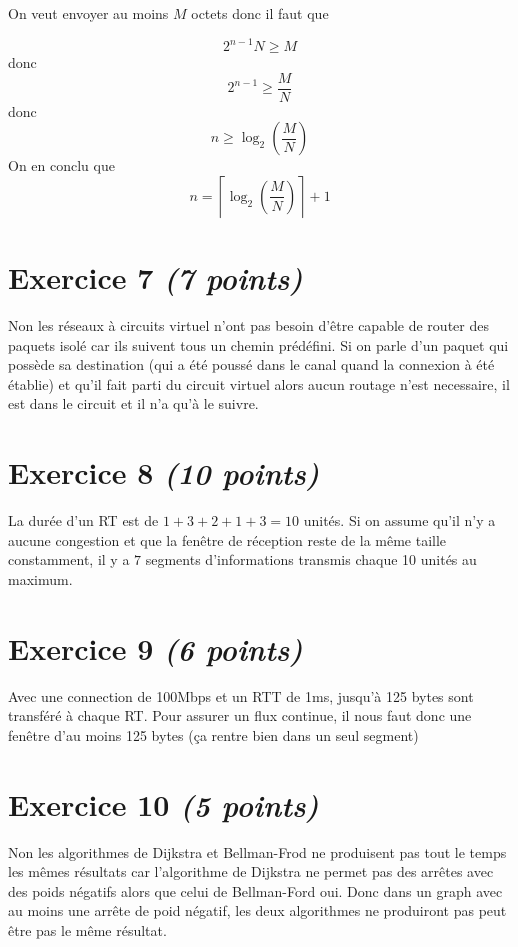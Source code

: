 \documentclass{article}
\begin{document}
\hfill

On veut envoyer au moins $M$ octets donc il faut que 

$$ 2^{n-1} N \geqslant M  $$ donc $$ 2^{n-1} \geqslant \frac{M}{N} $$ donc $$ n \geqslant \log_2\left(\frac{M}{N}\right)$$
On en conclu que $$ n = \left\lceil \log_2\left(\frac{M}{N}\right)\right\rceil +1$$

\clearpage

\section{Exercice 7 \emph{(7 points)}}

Non les réseaux à circuits virtuel n'ont pas besoin d'être capable de router des paquets isolé car ils suivent tous un chemin prédéfini. Si on parle d'un paquet qui possède sa destination (qui a été poussé dans le canal quand la connexion à été établie) et qu'il fait parti du circuit virtuel alors aucun routage n'est necessaire, il est dans le circuit et il n'a qu'à le suivre.


\section{Exercice 8 \emph{(10 points)}}
La durée d'un RT est de $1 + 3 + 2 + 1 + 3 = 10$ unités. Si on assume qu'il n'y a aucune congestion et que la fenêtre de réception reste de la même taille constamment, il y a $7$ segments d'informations transmis chaque 10 unités au maximum.


\section{Exercice 9 \emph{(6 points)}}
Avec  une connection de 100Mbps et un RTT de 1ms, jusqu'à 125 bytes sont transféré à chaque RT.
Pour assurer un flux continue, il nous faut donc une fenêtre d'au moins 125 bytes (ça rentre bien dans un seul segment)


\section{Exercice 10 \emph{(5 points)}}

Non les algorithmes de Dijkstra et Bellman-Frod ne produisent pas tout le temps les mêmes résultats car l'algorithme de Dijkstra ne permet pas des arrêtes avec des poids négatifs alors que celui de Bellman-Ford oui. Donc dans un graph avec au moins une arrête de poid négatif, les deux algorithmes ne produiront pas peut être pas le même résultat.
\end{document}
